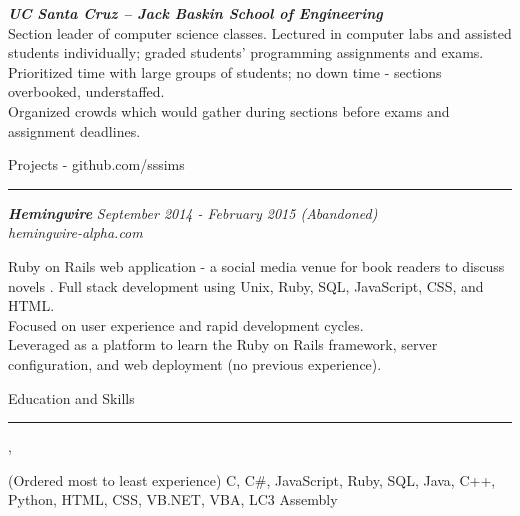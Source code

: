 \documentclass[10pt]{article}
\newcommand{\simsbullet}{{\raisebox{2pt}{\tiny $\bullet$}}\hspace{8pt}}
\begin{document}
\setlength{\leftskip}{0pt}

\vskip 8pt

{\bfseries\itshape\sffamily UC Santa Cruz -- Jack Baskin School of Engineering} \hfill {\itshape{}} \\
{\itshape{}}
\vskip 4pt
\setlength{\leftskip}{16pt}
Section leader of computer science classes. Lectured in computer labs and assisted students individually; graded students' programming assignments and exams. 
\vskip 4pt
\simsbullet Prioritized time with large groups of students; no down time - sections overbooked, understaffed.\\
\simsbullet Organized crowds which would gather during sections before exams and assignment deadlines. 

\setlength{\leftskip}{0pt}

\vskip 14pt

{\Large\sffamily Projects {\small - github.com/sssims}}
\vskip 1pt
\hrule
\vskip 6pt
{\bfseries\itshape\sffamily Hemingwire} \hfill \textsf{\textit{September 2014 - February 2015 (Abandoned)}}\\
\textit{\textsf{hemingwire-alpha.com}} 

\setlength{\leftskip}{16pt}

Ruby on Rails web application - a social media venue for book readers to discuss novels .
\vskip 4pt
\simsbullet Full stack development using Unix, Ruby, SQL, JavaScript, CSS, and HTML. \\
\simsbullet Focused on user experience and rapid development cycles. \\ 
\simsbullet Leveraged as a platform to learn the Ruby on Rails framework, server configuration, and web deployment (no previous experience).

\setlength{\leftskip}{0pt}

\vskip 14pt

{\Large\sffamily Education and Skills}
\vskip 4pt
\hrule
\vskip 6pt
{}
\vskip 2pt
\hspace*{12pt} {\itshape{}}, {} \\
\hspace*{12pt} {\itshape{}}


\vskip 6pt
{ (Ordered most to least experience)}
\vskip 2pt
\hspace*{12pt} {\sffamily C, C\#, JavaScript, Ruby, SQL, Java, C++, Python, HTML, CSS, VB.NET, VBA, LC3 Assembly}
\end{document}
